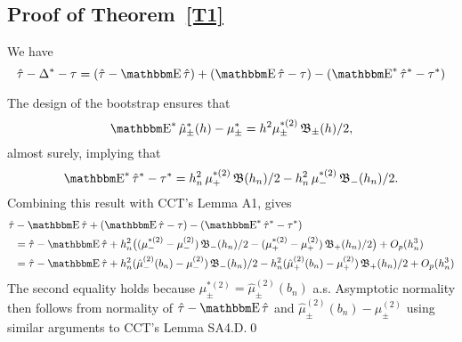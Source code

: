 \documentclass[12pt,fleqn]{article}
\begin{document}
\subsection{Proof of Theorem~\ref{T1}}
We have
\begin{equation*}
  \hat\tau - \Delta^* - \tau = (\hat\tau - \E \hat \tau) +
  (\E \hat \tau - \tau) - (\E^* \hat \tau^* - \tau^*)
\end{equation*}

The design of the bootstrap ensures that
\begin{equation*}
  \label{eq:7}
  \E^* \hat\mu_{\pm}^*(h) - \mu_{\pm}^{*} = h^{2} \mu_\pm^{*(2)} \Bf_{\pm}(h)/2,
\end{equation*}
almost surely, implying that
\begin{equation*}
  \label{eq:20}
    \E^* \hat\tau^{*} - \tau^{*} = h_n^2\, \mu_+^{*(2)} \Bf(h_n)/2
      - h_n^2\, \mu_{-}^{*(2)} \Bf_{-}(h_n)/2.
\end{equation*}
Combining this result with CCT's Lemma A1, gives
\begin{align*}
  \hat\tau &- \E \hat\tau + (\E \hat\tau - \tau) - (\E^* \hat\tau^* - \tau^*)\\
  &= \hat\tau - \E\hat\tau
   + h_n^2 \big((\mu_{-}^{*(2)} - \mu_{-}^{(2)}) \Bf_{-}(h_{n}) /2
   - (\mu_+^{*(2)}-\mu_+^{(2)}) \Bf_{+}(h_{n}) / 2 \big) + O_p(h_n^{3}) \\
  &= \hat\tau - \E\hat\tau
   + h_n^2 (\hat\mu_-^{(2)}(b_n) - \mu_-^{(2)}) \Bf_{-}(h_{n}) /2
   - h_n^2 (\hat\mu_+^{(2)}(b_n) - \mu_+^{(2)}) \Bf_{+}(h_{n}) / 2 + O_p(h_n^{3})
\end{align*}
The second equality holds because
$\mu_\pm^{*(2)} = \hat\mu_{\pm}^{(2)}(b_n)$ a.s. Asymptotic normality then
follows from normality of $\hat\tau - \E\hat\tau$ and
$\hat\mu_\pm^{(2)}(b_n) - \mu_\pm^{(2)}$ using
similar arguments to CCT's Lemma SA4.D.\qed

\clearpage


\end{document}
